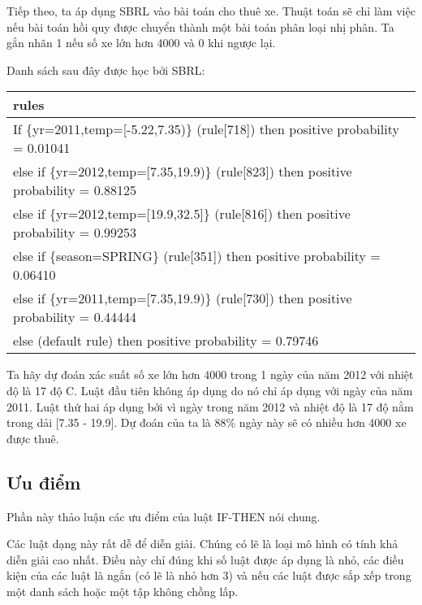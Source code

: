 Tiếp theo, ta áp dụng SBRL vào bài toán cho thuê xe. Thuật toán sẽ chỉ làm việc nếu bài toán hồi quy được chuyển thành một bài toán phân loại nhị phân. Ta gắn nhãn 1 nếu số xe lớn hơn 4000 và 0 khi ngược lại.

Danh sách sau đây được học bởi SBRL:

\begin{table*}[hbt!]
\centering
\begin{tabular}{|l|}
\hline
\textbf{rules}                                                                                  \\ \hline
If \{yr=2011,temp={[}-5.22,7.35)\} (rule{[}718{]}) then positive probability = 0.01041       \\ \hline
else if \{yr=2012,temp={[}7.35,19.9)\} (rule{[}823{]}) then positive probability = 0.88125   \\ \hline
else if \{yr=2012,temp={[}19.9,32.5{]}\} (rule{[}816{]}) then positive probability = 0.99253 \\ \hline
else if \{season=SPRING\} (rule{[}351{]}) then positive probability = 0.06410                \\ \hline
else if \{yr=2011,temp={[}7.35,19.9)\} (rule{[}730{]}) then positive probability = 0.44444   \\ \hline
else (default rule) then positive probability = 0.79746                                      \\ \hline
\end{tabular}
\end{table*}

Ta hãy dự đoán xác suất số xe lớn hơn 4000 trong 1 ngày của năm 2012 với nhiệt độ là 17 độ C. Luật đầu tiên không áp dụng do nó chỉ áp dụng với ngày của năm 2011. Luật thứ hai áp dụng bởi vì ngày trong năm 2012 và nhiệt độ là 17 độ nằm trong dải [7.35 - 19.9]. Dự đoán của ta là 88\% ngày này sẽ có nhiều hơn 4000 xe được thuê.

\clearpage
\subsection{Ưu điểm}
Phần này thảo luận các ưu điểm của luật IF-THEN nói chung.

Các luật dạng này rất dễ để diễn giải. Chúng có lẽ là loại mô hình có tính khả diễn giải cao nhất. Điều này chỉ đúng khi số luật được áp dụng là nhỏ, các điều kiện của các luật là ngắn (có lẽ là nhỏ hơn 3) và nếu các luật được sắp xếp trong một danh sách hoặc một tập không chồng lấp.

